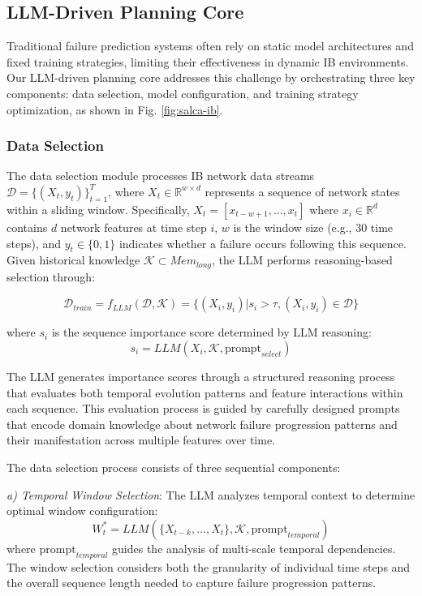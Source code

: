 \documentclass[conference]{IEEEtran}
\begin{document}
\subsection{LLM-Driven Planning Core}
Traditional failure prediction systems often rely on static model architectures and fixed training strategies, limiting their effectiveness in dynamic IB environments. Our LLM-driven planning core addresses this challenge by orchestrating three key components: data selection, model configuration, and training strategy optimization, as shown in Fig. \ref{fig:salca-ib}.

\subsubsection{Data Selection}
The data selection module processes IB network data streams $\mathcal{D} = \{(X_t, y_t)\}_{t=1}^T$, where $X_t \in \mathbb{R}^{w \times d}$ represents a sequence of network states within a sliding window. Specifically, $X_t = [x_{t-w+1}, ..., x_t]$ where $x_i \in \mathbb{R}^d$ contains $d$ network features at time step $i$, $w$ is the window size (e.g., 30 time steps), and $y_t \in \{0,1\}$ indicates whether a failure occurs following this sequence. Given historical knowledge $\mathcal{K} \subset Mem_{long}$, the LLM performs reasoning-based selection through:

\begin{equation}
    \mathcal{D}_{train} = f_{LLM}(\mathcal{D}, \mathcal{K}) = \{(X_i, y_i) | s_i > \tau, (X_i, y_i) \in \mathcal{D}\}
\end{equation}

where $s_i$ is the sequence importance score determined by LLM reasoning:
\begin{equation}
    s_i = LLM(X_i, \mathcal{K}, \text{prompt}_{select})
\end{equation}

The LLM generates importance scores through a structured reasoning process that evaluates both temporal evolution patterns and feature interactions within each sequence. This evaluation process is guided by carefully designed prompts that encode domain knowledge about network failure progression patterns and their manifestation across multiple features over time.

The data selection process consists of three sequential components:

\textit{a) Temporal Window Selection}: The LLM analyzes temporal context to determine optimal window configuration:
\begin{equation}
    W_t^* = LLM(\{X_{t-k}, ..., X_t\}, \mathcal{K}, \text{prompt}_{temporal})
\end{equation}
where $\text{prompt}_{temporal}$ guides the analysis of multi-scale temporal dependencies. The window selection considers both the granularity of individual time steps and the overall sequence length needed to capture failure progression patterns.
\end{document}
